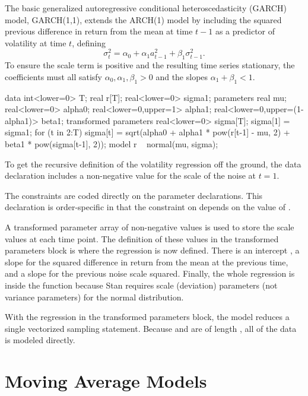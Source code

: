 The basic generalized autoregressive conditional heteroscedasticity
(GARCH) model, GARCH(1,1), extends the ARCH(1) model by including the
squared previous difference in return from the mean at time $t-1$ as a
predictor of volatility at time $t$, defining
%
\[
\sigma^2_t = \alpha_0 + \alpha_1 a^2_{t-1} + \beta_1 \sigma^2_{t-1}.
\]
%
To ensure the scale term is positive and the resulting time series
stationary, the coefficients must all satisfy $\alpha_0, \alpha_1,
\beta_1 > 0$ and the slopes $\alpha_1 + \beta_1 < 1$.
%
\begin{stancode}
data {
  int<lower=0> T; 
  real r[T];
  real<lower=0> sigma1; 
}
parameters {
  real mu; 
  real<lower=0> alpha0;          
  real<lower=0,upper=1> alpha1;  
  real<lower=0,upper=(1-alpha1)> beta1; 
}
transformed parameters {
  real<lower=0> sigma[T];
  sigma[1] = sigma1;
  for (t in 2:T)
    sigma[t] = sqrt(alpha0 
                     + alpha1 * pow(r[t-1] - mu, 2)
                     + beta1 * pow(sigma[t-1], 2));
}
model {
  r ~ normal(mu, sigma);
}
\end{stancode}
%
To get the recursive definition of the volatility regression off the
ground, the data declaration includes a non-negative value 
 for the scale of the noise at $t = 1$. 

The constraints are coded directly on the parameter declarations.
This declaration is order-specific in that the constraint on 
depends on the value of . 

A transformed parameter array of non-negative values  is
used to store the scale values at each time point.  The definition of
these values in the transformed parameters block is where the
regression is now defined.  There is an intercept , a
slope  for the squared difference in return from the mean
at the previous time, and a slope  for the previous noise
scale squared.  Finally, the whole regression is inside the
 function because Stan requires scale (deviation) parameters (not
variance parameters) for the normal distribution.

With the regression in the transformed parameters block, the model
reduces a single vectorized sampling statement.  Because  and
 are of length , all of the data is modeled
directly.


\section{Moving Average Models}

